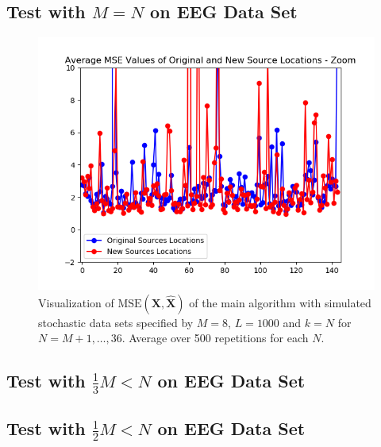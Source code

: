 
\subsection{Test with $M=N$ on EEG Data Set}

\begin{figure}[H]
    \centering
	\includegraphics[scale=0.5]{figures/ch_7/M=N_1.png}
	\caption{Visualization of $\text{MSE}(\mathbf{X}, \hat{\mathbf{X}})$ of the main algorithm with simulated stochastic data sets specified by $M = 8$, $L=1000$ and $k = N$ for $N = M+1, \hdots , 36$. Average over 500 repetitions for each $N$.}
	\label{fig:varyN2}
\end{figure}  



\subsection{Test with $\frac{1}{3} M<N$ on EEG Data Set}

\subsection{Test with $\frac{1}{2} M<N$ on EEG Data Set}
